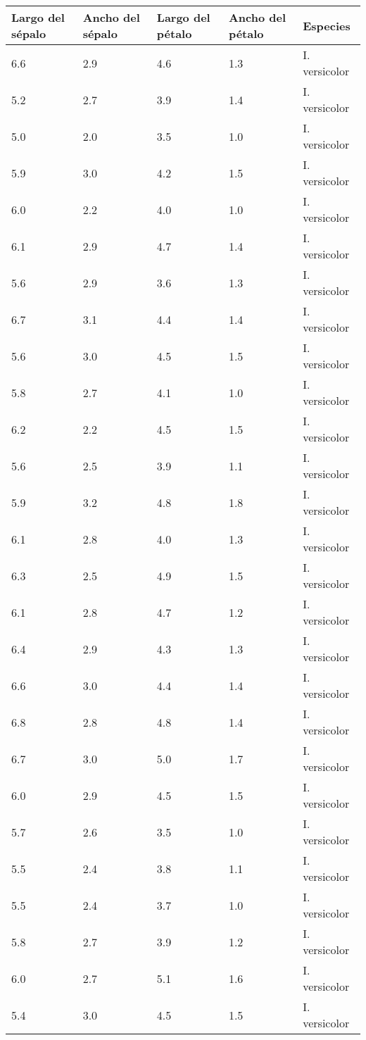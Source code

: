 \begin{appendices}
\begin{center}
\begin{tabular}{|p{2cm}|p{2cm}|p{2cm}|p{2cm}|p{2cm}|}
\hline
Largo del sépalo & Ancho del sépalo & Largo del pétalo & Ancho del pétalo & Especies \\
\hline
6.6	& 2.9 & 4.6	& 1.3 & I. versicolor\\
\hline
5.2	& 2.7 & 3.9	& 1.4 & I. versicolor\\
\hline
5.0	& 2.0 & 3.5	& 1.0 & I. versicolor\\
\hline
5.9	& 3.0 & 4.2	& 1.5 & I. versicolor\\
\hline
6.0	& 2.2 & 4.0	& 1.0 & I. versicolor\\
\hline
6.1	& 2.9 & 4.7	& 1.4 & I. versicolor\\
\hline
5.6	& 2.9 & 3.6	& 1.3 & I. versicolor\\
\hline
6.7	& 3.1 & 4.4	& 1.4 & I. versicolor\\
\hline
5.6	& 3.0 & 4.5	& 1.5 & I. versicolor\\
\hline
5.8	& 2.7 & 4.1	& 1.0 & I. versicolor\\
\hline
6.2	& 2.2 & 4.5	& 1.5 & I. versicolor\\
\hline
5.6	& 2.5 & 3.9	& 1.1 & I. versicolor\\
\hline
5.9	& 3.2 & 4.8	& 1.8 & I. versicolor\\
\hline
6.1	& 2.8 & 4.0	& 1.3 & I. versicolor\\
\hline
6.3	& 2.5 & 4.9	& 1.5 & I. versicolor\\
\hline
6.1	& 2.8 & 4.7	& 1.2 & I. versicolor\\
\hline
6.4	& 2.9 & 4.3	& 1.3 & I. versicolor\\
\hline
6.6	& 3.0 & 4.4	& 1.4 & I. versicolor\\
\hline
6.8	& 2.8 & 4.8	& 1.4 & I. versicolor\\
\hline
6.7	& 3.0 & 5.0	& 1.7 & I. versicolor\\
\hline
6.0	& 2.9 & 4.5	& 1.5 & I. versicolor\\
\hline
5.7	& 2.6 & 3.5	& 1.0 & I. versicolor\\
\hline
5.5	& 2.4 & 3.8	& 1.1 & I. versicolor\\
\hline
5.5	& 2.4 & 3.7	& 1.0 & I. versicolor\\
\hline
5.8	& 2.7 & 3.9	& 1.2 & I. versicolor\\
\hline
6.0	& 2.7 & 5.1	& 1.6 & I. versicolor\\
\hline
5.4	& 3.0 & 4.5	& 1.5 & I. versicolor\\

\end{tabular}
\end{center}
\end{appendices}

